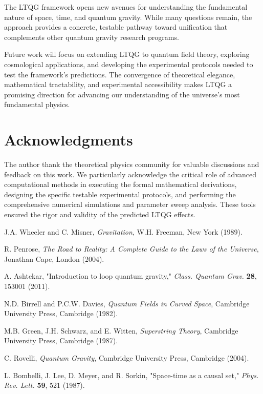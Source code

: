 \documentclass[12pt,a4paper]{article}
\begin{document}
The LTQG framework opens new avenues for understanding the fundamental nature of space, time, and quantum gravity. While many questions remain, the approach provides a concrete, testable pathway toward unification that complements other quantum gravity research programs.

Future work will focus on extending LTQG to quantum field theory, exploring cosmological applications, and developing the experimental protocols needed to test the framework's predictions. The convergence of theoretical elegance, mathematical tractability, and experimental accessibility makes LTQG a promising direction for advancing our understanding of the universe's most fundamental physics.

\section*{Acknowledgments}

The author thank the theoretical physics community for valuable discussions and feedback on this work. We particularly acknowledge the critical role of advanced computational methods in executing the formal mathematical derivations, designing the specific testable experimental protocols, and performing the comprehensive numerical simulations and parameter sweep analysis. These tools ensured the rigor and validity of the predicted LTQG effects.



\begin{thebibliography}{99}

J.A. Wheeler and C. Misner,
\emph{Gravitation},
W.H. Freeman, New York (1989).

R. Penrose,
\emph{The Road to Reality: A Complete Guide to the Laws of the Universe},
Jonathan Cape, London (2004).

A. Ashtekar,
"Introduction to loop quantum gravity,"
\emph{Class. Quantum Grav.} \textbf{28}, 153001 (2011).

N.D. Birrell and P.C.W. Davies,
\emph{Quantum Fields in Curved Space},
Cambridge University Press, Cambridge (1982).

M.B. Green, J.H. Schwarz, and E. Witten,
\emph{Superstring Theory},
Cambridge University Press, Cambridge (1987).

C. Rovelli,
\emph{Quantum Gravity},
Cambridge University Press, Cambridge (2004).

L. Bombelli, J. Lee, D. Meyer, and R. Sorkin,
"Space-time as a causal set,"
\emph{Phys. Rev. Lett.} \textbf{59}, 521 (1987).

\end{thebibliography}
\end{document}

